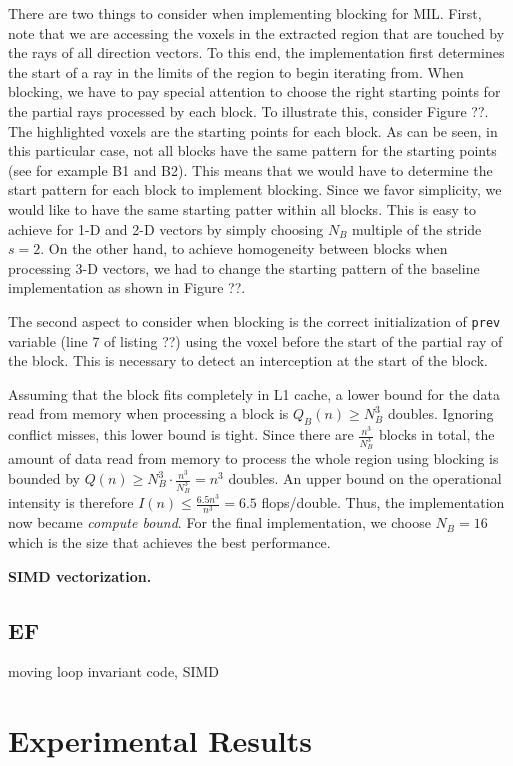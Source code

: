 \documentclass[letterpaper]{article}
\newcommand{\mypar}[1]{{\bf #1.}}
\begin{document}
There are two things to consider when implementing blocking for MIL. First, note that we are accessing the voxels in the extracted region that are touched by the rays of all direction vectors. To this end, the implementation first determines the start of a ray in the limits of the region to begin iterating from. When blocking, we have to pay special attention to choose the right starting points for the partial rays processed by each block. To illustrate this, consider Figure ??. The highlighted voxels are the starting points for each block. As can be seen, in this particular case, not all blocks have the same pattern for the starting points (see for example B1 and B2). This means that we would have to determine the start pattern for each block to implement blocking. Since we favor simplicity, we would like to have the same starting patter within all blocks. This is easy to achieve for 1-D and 2-D vectors by simply choosing $N_B$ multiple of the stride $s=2$. On the other hand, to achieve homogeneity between blocks when processing 3-D vectors, we had to change the starting pattern of the baseline implementation as shown in Figure ??.

The second aspect to consider when blocking is the correct initialization of \texttt{prev} variable (line 7 of listing ??) using the voxel before the start of the partial ray of the block. This is necessary to detect an interception at the start of the block. 

Assuming that the block fits completely in L1 cache, a lower bound for the data read from memory when processing a block is $Q_B(n) \geq N_B^3$ doubles. Ignoring conflict misses, this lower bound is tight. Since there are $\frac{n^3}{N_B^3}$ blocks in total, the amount of data read from memory to process the whole region using blocking is bounded by $Q(n) \geq N_B^3 \cdot \frac{n^3}{N_B^3} = n^3$ doubles. An upper bound on the operational intensity is therefore $I(n) \leq \frac{6.5n^3}{n^3} = 6.5$ flops/double. Thus, the implementation now became \textit{compute bound}. For the final implementation, we choose $N_B = 16$ which is the size that achieves the best performance.

\mypar{SIMD vectorization}


\subsection{EF} moving loop invariant code, SIMD


\section{Experimental Results}\label{sec:exp}
\end{document}
